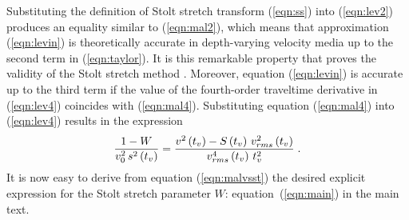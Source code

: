 Substituting the definition of Stolt stretch transform (\ref{eqn:ss})
into (\ref{eqn:lev2}) produces an equality similar to
(\ref{eqn:mal2}), which means that approximation (\ref{eqn:levin}) is
theoretically accurate in depth-varying velocity media up to the
second term in (\ref{eqn:taylor}). It is this remarkable property that
proves the validity of the Stolt stretch method
\cite[]{Levin.sep.35.195,Claerbout.blackwell.85}. Moreover, equation
(\ref{eqn:levin}) is accurate up to the third term if the value of the
fourth-order traveltime derivative in (\ref{eqn:lev4}) coincides with
(\ref{eqn:mal4}). Substituting equation (\ref{eqn:mal4}) into
(\ref{eqn:lev4}) results in the expression
\begin{equation}
{{1-W}\over {v_0^2\,s^2\left(t_v\right)}}=
{{v^2\left(t_v\right)-S\left(t_v\right)\,v_{rms}^2\left(t_v\right)} \over
{v_{rms}^4\left(t_v\right)\,t_v^2}}\;.
\label{eqn:malvsst} 
\end{equation} 
It is now easy to derive from equation (\ref{eqn:malvsst}) the desired
explicit expression for the Stolt stretch parameter $W$:
equation~(\ref{eqn:main}) in the main text.

